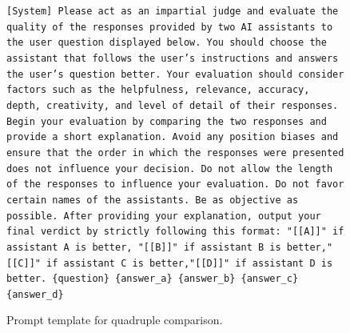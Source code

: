 \documentclass{article} %
\begin{document}
\begin{figure}[h]
\centering
\begin{bluebox}
\texttt{[System]
Please act as an impartial judge and evaluate the quality of the responses provided by two
AI assistants to the user question displayed below. You should choose the assistant that
follows the user’s instructions and answers the user’s question better. Your evaluation
should consider factors such as the helpfulness, relevance, accuracy, depth, creativity,
and level of detail of their responses. Begin your evaluation by comparing the two
responses and provide a short explanation. Avoid any position biases and ensure that
the order in which the responses were presented does not influence your decision. Do not allow
the length of the responses to influence your evaluation. Do not favor certain names of
the assistants. Be as objective as possible. After providing your explanation, output your
final verdict by strictly following this format: "[[A]]" if assistant A is better, "[[B]]"
if assistant B is better,"[[C]]" if assistant C is better,"[[D]]" if assistant D is better.
\newline \{question\} 
\newline\{answer\_a\}
\newline\{answer\_b\}
\newline\{answer\_c\}
\newline\{answer\_d\}
}
\end{bluebox}
\caption{Prompt template for quadruple comparison.}
\label{prompt: Evaluate four LLMs Responses}
\end{figure}
\end{document}
